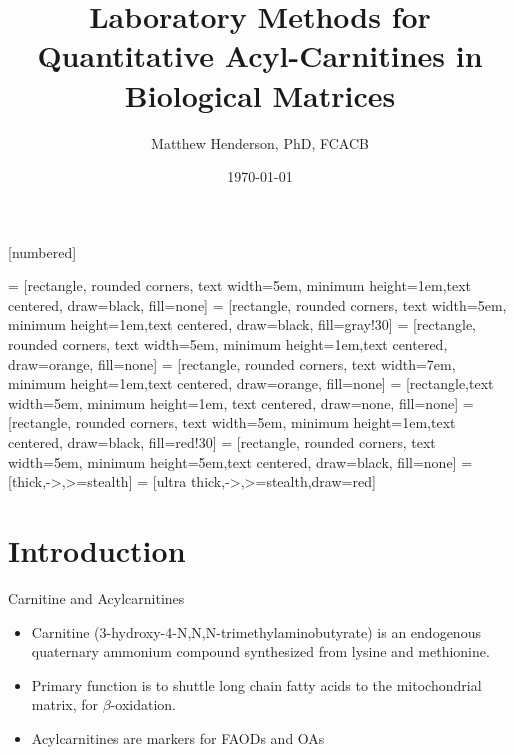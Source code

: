 \documentclass[presentation, smaller]{beamer}
\author{Matthew Henderson, PhD, FCACB}
\date{\today}
\title{Laboratory Methods for Quantitative Acyl-Carnitines in Biological Matrices}
\institute[NSO]{Newborn Screening Ontario | The University of Ottawa}
\begin{document}
\maketitle

\vspace{220pt}
\beamertemplatenavigationsymbolsempty
{}[numbered]

 = [rectangle, rounded corners, text width=5em, minimum height=1em,text centered, draw=black, fill=none]
 = [rectangle, rounded corners, text width=5em, minimum height=1em,text centered, draw=black, fill=gray!30]
 = [rectangle, rounded corners, text width=5em, minimum height=1em,text centered, draw=orange, fill=none]
 = [rectangle, rounded corners, text width=7em, minimum height=1em,text centered, draw=orange, fill=none]
 = [rectangle,text width=5em, minimum height=1em, text centered, draw=none, fill=none]
 = [rectangle, rounded corners, text width=5em, minimum height=1em,text centered, draw=black, fill=red!30]
 = [rectangle, rounded corners, text width=5em, minimum height=5em,text centered, draw=black, fill=none]
 = [thick,->,>=stealth]
 = [ultra thick,->,>=stealth,draw=red]

\section{Introduction}
\label{sec:orgheadline7}
\begin{frame}[label={sec:orgheadline1}]{Carnitine and Acylcarnitines}
\begin{itemize}
\item Carnitine (3-hydroxy-4-N,N,N-trimethylaminobutyrate) is
an endogenous quaternary ammonium compound synthesized from lysine
and methionine.

\item Primary function is to shuttle long chain fatty acids to the
mitochondrial matrix, for \(\beta\)-oxidation.
\item Acylcarnitines are markers for FAODs and OAs
\end{itemize}
\vspace{2em}
\centering
{}
\hspace{3em}
\end{frame}
\end{document}
